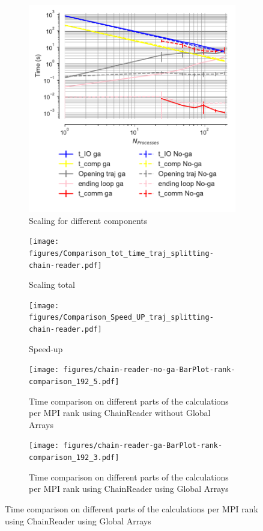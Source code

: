  \begin{figure}[ht!]
\centering
\begin{subfigure}{.3\textwidth}
  \includegraphics[width=\linewidth]{figures/Comparison_IO_compute_scaling_traj_splitting-chain-reader.pdf}
  \captionsetup{format=hang}
  \caption{Scaling for different components}
  \label{fig:MPIscaling-chain-reader}
\end{subfigure}
\hfill
\begin{subfigure}{.3\textwidth}
  \texttt{[image: figures/Comparison\_tot\_time\_traj\_splitting-chain-reader.pdf]}
  \caption{Scaling total}
  \label{fig:MPItottime-chain-reader}
\end{subfigure}
\hfill
\begin{subfigure}{.3\textwidth}
  \texttt{[image: figures/Comparison\_Speed\_UP\_traj\_splitting-chain-reader.pdf]}
  \caption{Speed-up}
  \label{fig:MPIspeedup-chain-reader}
\end{subfigure}
\bigskip

\begin{subfigure} {.45\textwidth}
  \texttt{[image: figures/chain-reader-no-ga-BarPlot-rank-comparison\_192\_5.pdf]}
  \captionsetup{format=hang}
   \caption{Time comparison on different parts of the calculations per MPI rank using ChainReader without Global Arrays}
  \label{fig:MPIranks-split-chain-reader}
\end{subfigure}
\hfill
\begin{subfigure} {.45\textwidth}
  \texttt{[image: figures/chain-reader-ga-BarPlot-rank-comparison\_192\_3.pdf]}
  \captionsetup{format=hang}
  \caption{Time comparison on different parts of the calculations per MPI rank using ChainReader using Global Arrays}
  \label{fig:MPIranks-split-ga-chain-reader}
\end{subfigure}


\end{figure}
